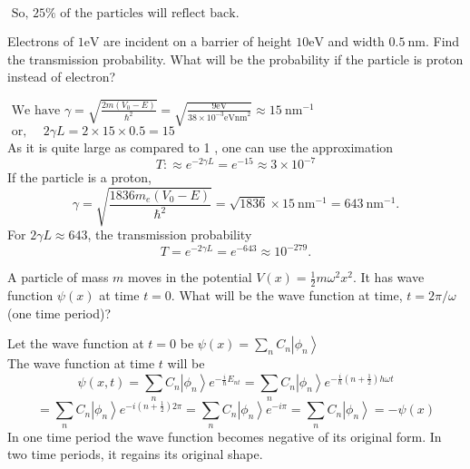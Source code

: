 \begin{enumerate}
\begin{answer}
	$\text { So, } 25 \% \text { of the particles will reflect back. }$
\end{answer}
	\begin{minipage}{\textwidth}
	\item Electrons of $1 \mathrm{eV}$ are incident on a barrier of height $10 \mathrm{eV}$ and width $0.5 \mathrm{~nm} .$ Find the transmission probability. What will be the probability if the particle is proton instead of electron?
\end{minipage}
\begin{answer}
	$\text { We have } \gamma=\sqrt{\frac{2 m\left(V_{0}-E\right)}{\hbar^{2}}}=\sqrt{\frac{9 \mathrm{eV}}{38 \times 10^{-3} \mathrm{eVnm}^{2}}} \approx 15 \mathrm{~nm}^{-1}$\\
	$\text { or, } \quad 2 \gamma L=2 \times 15 \times 0.5=15$\\
	As it is quite large as compared to 1 , one can use the approximation
	$$
	T: \approx e^{-2 \gamma L}=e^{-15} \approx 3 \times 10^{-7}
	$$
	If the particle is a proton,
	$$
	\gamma=\sqrt{\frac{1836 m_{e}\left(V_{0}-E\right)}{\hbar^{2}}}=\sqrt{1836} \times 15 \mathrm{~nm}^{-1}=643 \mathrm{~nm}^{-1} .
	$$
	For $2 \gamma L \approx 643$, the transmission probability
	$$
	T=e^{-2 \gamma L}=e^{-643} \approx 10^{-279} .
	$$
\end{answer}
	\begin{minipage}{\textwidth}
	\item A particle of mass $m$ moves in the potential $V(x)=\frac{1}{2} m \omega^{2} x^{2} .$ It has wave function $\psi(x)$ at time $t=0$. What will be the wave function at time, $t=2 \pi / \omega$ (one time period)?
\end{minipage}
\begin{answer}
	Let the wave function at $t=0$ be $\psi(x)=\sum_{n} C_{n}\left|\phi_{n}\right\rangle$\\
	The wave function at time $t$ will be
	$$
	\psi(x, t)=\sum_{n} C_{n}\left|\phi_{n}\right\rangle e^{-\frac{i}{\hbar} E_{n t}}=\sum_{n} C_{n}\left|\phi_{n}\right\rangle e^{-\frac{i}{\hbar}\left(n+\frac{1}{2}\right) h\omega t}
	$$
	$$=\sum_{n} C_{n}\left|\phi_{n}\right\rangle e^{-i\left(n+\frac{1}{2}\right) 2 \pi}=\sum_{n} C_{n}\left|\phi_{n}\right\rangle e^{-i \pi}=\sum_{n} C_{n}\left|\phi_{n}\right\rangle=-\psi(x)$$
	In one time period the wave function becomes negative of its original form. In two time periods, it regains its original shape.
\end{answer}
	\begin{minipage}{\textwidth}

\end{minipage}
\end{enumerate}
